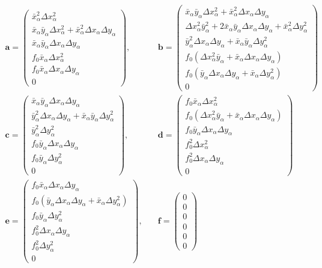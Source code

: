 \documentclass[12pt,a4j]{jsarticle}
\newcommand{\bxa}{\bar{x}_\alpha}
\newcommand{\dxa}{\Delta x_\alpha}
\newcommand{\bya}{\bar{y}_\alpha}
\newcommand{\dya}{\Delta y_\alpha}
\begin{document}
      \begin{align*}
        \bm{a} = \begin{pmatrix}
          \bxa^2\dxa^2 \\ \bxa\bya\dxa^2 + \bxa^2\dxa\dya \\
          \bxa\bya\dxa\dya \\ f_0\bxa\dxa^2 \\
          f_0\bxa\dxa\dya \\ 0
        \end{pmatrix}, \quad& \bm{b} = \begin{pmatrix}
          \bxa\bya\dxa^2 + \bxa^2\dxa\dya \\ \dxa^2\bya^2 + 2\bxa\bya\dxa\dya + \bxa^2\dya^2 \\
          \bya^2\dxa\dya + \bxa\bya\dya^2 \\ f_0(\dxa^2\bya + \bxa\dxa\dya) \\
          f_0(\bya\dxa\dya + \bxa\dya^2) \\ 0
        \end{pmatrix} \\
        \bm{c} = \begin{pmatrix}
          \bxa\bya\dxa\dya \\ \bya^2\dxa\dya + \bxa\bya\dya^2 \\
          \bya^2\dya^2 \\ f_0\bya\dxa\dya \\
          f_0\bya\dya^2 \\ 0
        \end{pmatrix} ,\quad& \bm{d} = \begin{pmatrix}
          f_0\bxa\dxa^2 \\ f_0(\dxa^2\bya + \bxa\dxa\dya) \\
          f_0\bya\dxa\dya \\ f_0^2\dxa^2 \\
          f_0^2\dxa\dya \\ 0
        \end{pmatrix} \\
        \bm{e} = \begin{pmatrix}
          f_0\bxa\dxa\dya \\ f_0(\bya\dxa\dya + \bxa\dya^2) \\
          f_0\bya\dya^2 \\ f_0^2\dxa\dya \\
          f_0^2\dya^2 \\ 0
        \end{pmatrix} ,\quad& \bm{f} = \begin{pmatrix}
          0 \\ 0 \\
          0 \\ 0 \\
          0 \\ 0
        \end{pmatrix}
      \end{align*}
\end{document}
